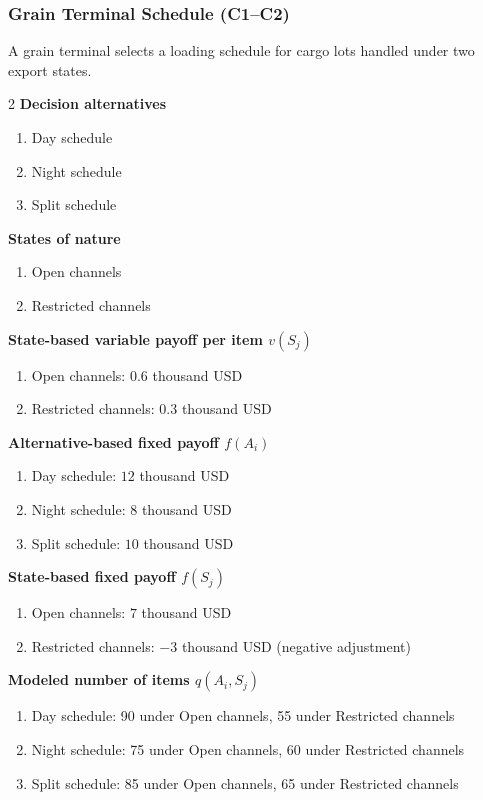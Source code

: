 	\subsubsection{Grain Terminal Schedule (C1--C2)}
	\label{sec:problem33-grain-terminal-schedule-c1-c2}
	A grain terminal selects a loading schedule for cargo lots handled under two export states.
	\begin{multicols}{2}
	\textbf{Decision alternatives}
	\begin{enumerate}[label=\arabic*.]
\item Day schedule
\item Night schedule
\item Split schedule
	\end{enumerate}
	\textbf{States of nature}
	\begin{enumerate}[label=\arabic*.]
\item Open channels
\item Restricted channels
	\end{enumerate}
	\columnbreak
	\textbf{State-based variable payoff per item $v(S_j)$}
\begin{enumerate}[label=\arabic*.]
\item Open channels: $0.6$ thousand USD
\item Restricted channels: $0.3$ thousand USD\end{enumerate}
\textbf{Alternative-based fixed payoff $f(A_i)$}
\begin{enumerate}[label=\arabic*.]
\item Day schedule: $12$ thousand USD
\item Night schedule: $8$ thousand USD
\item Split schedule: $10$ thousand USD\end{enumerate}
\textbf{State-based fixed payoff $f(S_j)$}
\begin{enumerate}[label=\arabic*.]
\item Open channels: $7$ thousand USD
\item Restricted channels: $-3$ thousand USD (negative adjustment)\end{enumerate}
\textbf{Modeled number of items $q(A_i,S_j)$}
\begin{enumerate}[label=\arabic*.]
\item Day schedule: 90 under Open channels, 55 under Restricted channels
\item Night schedule: 75 under Open channels, 60 under Restricted channels
\item Split schedule: 85 under Open channels, 65 under Restricted channels
\end{enumerate}
	\end{multicols}

